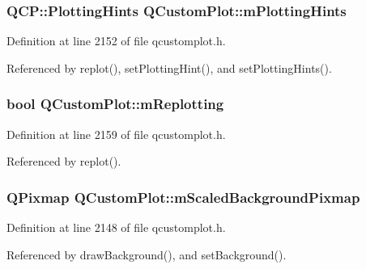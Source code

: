 \subsubsection[{m\+Plotting\+Hints}]{\setlength{\rightskip}{0pt plus 5cm}Q\+C\+P\+::\+Plotting\+Hints Q\+Custom\+Plot\+::m\+Plotting\+Hints\hspace{0.3cm}{\ttfamily [protected]}}\label{class_q_custom_plot_aa184197a6101a9cc5807469e1d006c9e}


Definition at line 2152 of file qcustomplot.\+h.



Referenced by replot(), set\+Plotting\+Hint(), and set\+Plotting\+Hints().

\hypertarget{class_q_custom_plot_ab30daeca6612c3948afd368dce5f1c39}{}
\subsubsection[{m\+Replotting}]{\setlength{\rightskip}{0pt plus 5cm}bool Q\+Custom\+Plot\+::m\+Replotting\hspace{0.3cm}{\ttfamily [protected]}}\label{class_q_custom_plot_ab30daeca6612c3948afd368dce5f1c39}


Definition at line 2159 of file qcustomplot.\+h.



Referenced by replot().

\hypertarget{class_q_custom_plot_a081bf046501d52642dc6d7e3bdb97d57}{}
\subsubsection[{m\+Scaled\+Background\+Pixmap}]{\setlength{\rightskip}{0pt plus 5cm}Q\+Pixmap Q\+Custom\+Plot\+::m\+Scaled\+Background\+Pixmap\hspace{0.3cm}{\ttfamily [protected]}}\label{class_q_custom_plot_a081bf046501d52642dc6d7e3bdb97d57}


Definition at line 2148 of file qcustomplot.\+h.



Referenced by draw\+Background(), and set\+Background().

\hypertarget{class_q_custom_plot_abc36e12dd0482117ad810a800c847722}{}
